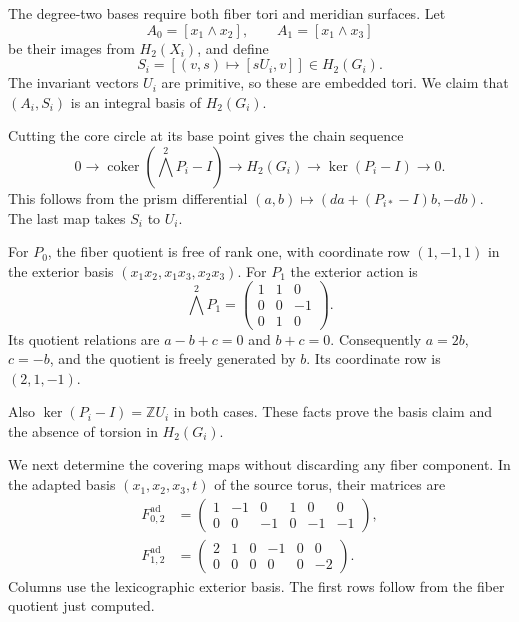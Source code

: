 The degree-two bases require both fiber tori and meridian surfaces.
Let
\[
A_0=[x_1\wedge x_2],\qquad A_1=[x_1\wedge x_3]
\]
be their images from $H_2(X_i)$, and define
\begin{equation}\label{mt:eq:S}
S_i=[(v,s)\longmapsto[sU_i,v]]\in H_2(G_i).
\end{equation}
The invariant vectors $U_i$ are primitive, so these are embedded tori.
We claim that $(A_i,S_i)$ is an integral basis of $H_2(G_i)$.

Cutting the core circle at its base point gives the chain sequence
\begin{equation}\label{mt:eq:wang}
0\longrightarrow\operatorname{coker}(\bigwedge^2P_i-I)
\longrightarrow H_2(G_i)
\longrightarrow\ker(P_i-I)\longrightarrow0.
\end{equation}
This follows from the prism differential
$(a,b)\mapsto(da+(P_{i*}-I)b,-db)$.
The last map takes $S_i$ to $U_i$.

For $P_0$, the fiber quotient is free of rank one, with coordinate row
$(1,-1,1)$ in the exterior basis $(x_1x_2,x_1x_3,x_2x_3)$.
For $P_1$ the exterior action is
\[
\bigwedge^2P_1=\begin{pmatrix}1&1&0\\0&0&-1\\0&1&0\end{pmatrix}.
\]
Its quotient relations are $a-b+c=0$ and $b+c=0$.
Consequently $a=2b$, $c=-b$, and the quotient is freely generated by $b$.
Its coordinate row is $(2,1,-1)$.

Also $\ker(P_i-I)=\mathbb ZU_i$ in both cases.
These facts prove the basis claim and the absence of torsion in $H_2(G_i)$.

We next determine the covering maps without discarding any fiber component.
In the adapted basis $(x_1,x_2,x_3,t)$ of the source torus, their matrices are
\begin{equation}\label{mt:eq:adapted}
\begin{aligned}
F^{\mathrm{ad}}_{0,2}&=\begin{pmatrix}1&-1&0&1&0&0\\0&0&-1&0&-1&-1\end{pmatrix},\\
F^{\mathrm{ad}}_{1,2}&=\begin{pmatrix}2&1&0&-1&0&0\\0&0&0&0&0&-2\end{pmatrix}.
\end{aligned}
\end{equation}
Columns use the lexicographic exterior basis.
The first rows follow from the fiber quotient just computed.

